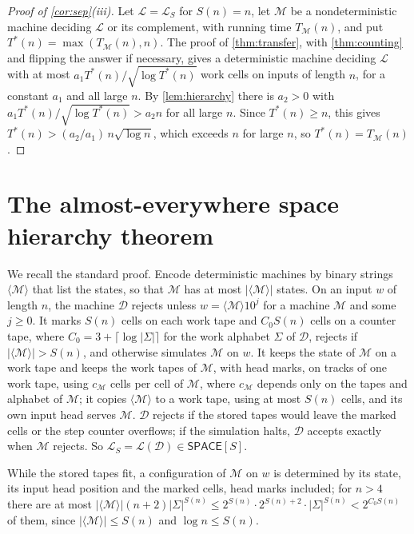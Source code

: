 \documentclass[11pt]{article}
\theoremstyle{definition}
\theoremstyle{definition}
\theoremstyle{remark}
\newcommand{\SPACE}{\mathsf{SPACE}}
\begin{document}
\begin{proof}[Proof of \cref{cor:sep}(iii)]
Let $\mathcal L=\mathcal L_S$ for $S(n)=n$, let $\mathcal M$ be a nondeterministic machine deciding $\mathcal L$ or its complement, with running time $T_{\mathcal M}(n)$, and put $T^*(n)=\max(T_{\mathcal M}(n),n)$. The proof of \cref{thm:transfer}, with \cref{thm:counting} and flipping the answer if necessary, gives a deterministic machine deciding $\mathcal L$ with at most $a_1T^*(n)/\sqrt{\log T^*(n)}$ work cells on inputs of length $n$, for a constant $a_1$ and all large $n$. By \cref{lem:hierarchy} there is $a_2>0$ with $a_1T^*(n)/\sqrt{\log T^*(n)}>a_2n$ for all large $n$. Since $T^*(n)\ge n$, this gives $T^*(n)>(a_2/a_1)\,n\sqrt{\log n}$, which exceeds $n$ for large $n$, so $T^*(n)=T_{\mathcal M}(n)$.
\end{proof}

\section{The almost-everywhere space hierarchy theorem}\label{app:hierarchy}

We recall the standard proof. Encode deterministic machines by binary strings $\langle\mathcal M\rangle$ that list the states, so that $\mathcal M$ has at most $|\langle\mathcal M\rangle|$ states. On an input $w$ of length $n$, the machine $\mathcal D$ rejects unless $w=\langle\mathcal M\rangle10^j$ for a machine $\mathcal M$ and some $j\ge0$. It marks $S(n)$ cells on each work tape and $C_0S(n)$ cells on a counter tape, where $C_0=3+\lceil\log|\Sigma|\rceil$ for the work alphabet $\Sigma$ of $\mathcal D$, rejects if $|\langle\mathcal M\rangle|>S(n)$, and otherwise simulates $\mathcal M$ on $w$. It keeps the state of $\mathcal M$ on a work tape and keeps the work tapes of $\mathcal M$, with head marks, on tracks of one work tape, using $c_{\mathcal M}$ cells per cell of $\mathcal M$, where $c_{\mathcal M}$ depends only on the tapes and alphabet of $\mathcal M$; it copies $\langle\mathcal M\rangle$ to a work tape, using at most $S(n)$ cells, and its own input head serves $\mathcal M$. $\mathcal D$ rejects if the stored tapes would leave the marked cells or the step counter overflows; if the simulation halts, $\mathcal D$ accepts exactly when $\mathcal M$ rejects. So $\mathcal L_S=\mathcal L(\mathcal D)\in\SPACE[S]$.

While the stored tapes fit, a configuration of $\mathcal M$ on $w$ is determined by its state, its input head position and the marked cells, head marks included; for $n>4$ there are at most $|\langle\mathcal M\rangle|(n+2)|\Sigma|^{S(n)}\le2^{S(n)}\cdot2^{S(n)+2}\cdot|\Sigma|^{S(n)}<2^{C_0S(n)}$ of them, since $|\langle\mathcal M\rangle|\le S(n)$ and $\log n\le S(n)$.
\end{document}
